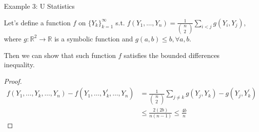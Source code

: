 Example 3: U Statistics

Let's define a function $f$ on $\{ Y_k\}_{k=1}^{\infty}$ s.t. $f(Y_1, \dots , Y_n) = \frac{1}{\left(\begin{array}{l}n \\ 2\end{array}\right)} \sum_{i<j} g\left(Y_{i}, Y_{j}\right)$, where $g: \mathbb{R}^2 \rightarrow \mathbb{R}$ is a symbolic function and $g(a,b) \leq b, \forall a,b$.

Then we can show that such function $f$ satisfies the bounded differences inequality. 

\begin{proof}
  \begin{equation}
    \begin{aligned}
        f\left(Y_{1}, \ldots, Y_{k}, \ldots, Y_{n}\right)-f\left(Y_{1}, \ldots, Y_{k}^{\prime}, \ldots, Y_{n}\right) &=\frac{1}{\left(\begin{array}{l}
        n \\
        2
        \end{array}\right)} \sum_{j \neq k} g\left(Y_{j}, Y_{k}\right)-g\left(Y_{j}, Y_{k}^{\prime}\right) \\
        & \leq \frac{2(2 b)}{n(n-1)} \leq \frac{4 b}{n}
    \end{aligned}
  \end{equation}
\end{proof}